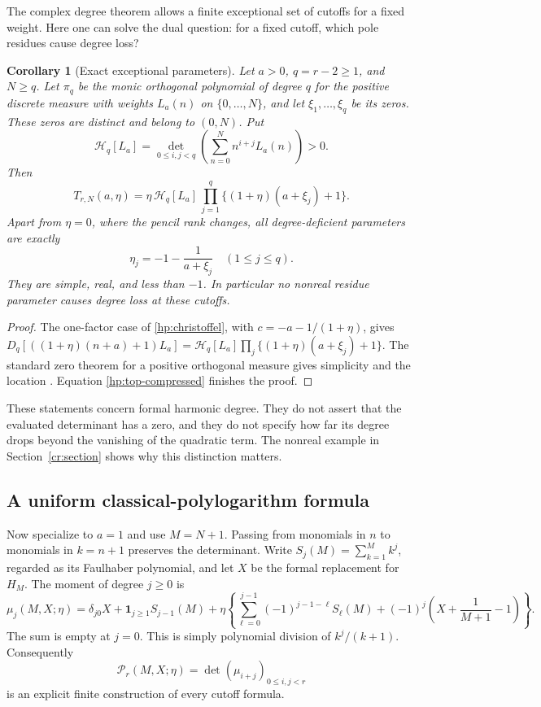\documentclass[11pt,a4paper]{article}
\newtheorem{corollary}[theorem]{Corollary}
\theoremstyle{definition}
\theoremstyle{remark}
\numberwithin{equation}{section}
\begin{document}
The complex degree theorem allows a finite exceptional set of
cutoffs for a fixed weight. Here one can solve the dual question:
for a fixed cutoff, which pole residues cause degree loss?

\begin{corollary}[Exact exceptional parameters]\label{hp:roots}
Let $a>0$, $q=r-2\ge1$, and $N\ge q$. Let $\pi_q$ be the monic
orthogonal polynomial of degree $q$ for the positive discrete
measure with weights $L_a(n)$ on $\{0,\ldots,N\}$, and let
$\xi_1,\ldots,\xi_q$ be its zeros. These zeros are distinct and
belong to $(0,N)$. Put
\[
 \mathcal H_q[L_a]=
 \det_{0\le i,j<q}\left(\sum_{n=0}^N n^{i+j}L_a(n)\right)>0.
\]
Then
\begin{equation}\label{hp:root-factorization}
 T_{r,N}(a,\eta)
  =\eta\,\mathcal H_q[L_a]\,
         \prod_{j=1}^q\{(1+\eta)(a+\xi_j)+1\}.
\end{equation}
Apart from $\eta=0$, where the pencil rank changes, all
degree-deficient parameters are exactly
\begin{equation}\label{hp:exceptional}
             \eta_j=-1-\frac1{a+\xi_j}\quad(1\le j\le q).
\end{equation}
They are simple, real, and less than $-1$. In particular no
nonreal residue parameter causes degree loss at these cutoffs.
\end{corollary}
\begin{proof}
The one-factor case of \eqref{hp:christoffel}, with
$c=-a-1/(1+\eta)$, gives
$D_q[((1+\eta)(n+a)+1)L_a]
=\mathcal H_q[L_a]\prod_j\{(1+\eta)(a+\xi_j)+1\}$.
The standard zero theorem for a positive orthogonal measure
gives simplicity and the location \cite[Section 18.2(vi)]{DLMF}.
Equation \eqref{hp:top-compressed} finishes the proof.
\end{proof}

These statements concern formal harmonic degree. They do not
assert that the evaluated determinant has a zero, and they do
not specify how far its degree drops beyond the vanishing of
the quadratic term. The nonreal example in
Section~\ref{cr:section} shows why this distinction matters.

\subsection{A uniform classical-polylogarithm formula}

Now specialize to $a=1$ and use $M=N+1$. Passing from monomials
in $n$ to monomials in $k=n+1$ preserves the determinant. Write
$S_j(M)=\sum_{k=1}^M k^j$, regarded as its Faulhaber polynomial,
and let $X$ be the formal replacement for $H_M$. The moment of
degree $j\ge0$ is
\begin{equation}\label{hp:compiler}
 \mu_j(M,X;\eta)=
 \delta_{j0}X+\mathbf1_{j\ge1}S_{j-1}(M)
 +\eta\left\{
   \sum_{\ell=0}^{j-1}(-1)^{j-1-\ell}S_\ell(M)
   +(-1)^j\left(X+\frac1{M+1}-1\right)\right\}.
\end{equation}
The sum is empty at $j=0$. This is simply polynomial division
of $k^j/(k+1)$. Consequently
\[
 \mathcal P_r(M,X;\eta)=\det(\mu_{i+j})_{0\le i,j<r}
\]
is an explicit finite construction of every cutoff formula.
\end{document}
